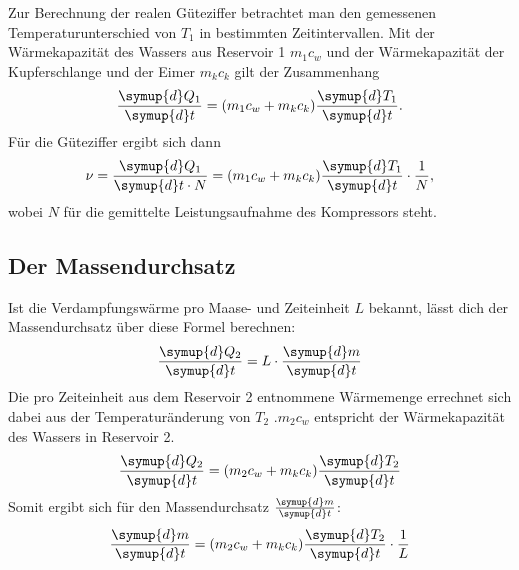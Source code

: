 Zur Berechnung der realen Güteziffer betrachtet man den gemessenen Temperaturunterschied von $T_1$ in bestimmten Zeitintervallen.
Mit der Wärmekapazität des Wassers aus Reservoir 1 $m_1c_w$ und der Wärmekapazität der Kupferschlange und der Eimer $m_kc_k$ gilt der Zusammenhang
\begin{equation}
    \frac{\symup{d}Q_1}{\symup{d}t} = (m_1c_w + m_kc_k) \frac{\symup{d}T_1}{\symup{d}t}.
\end{equation}
Für die Güteziffer ergibt sich dann 
\begin{equation}\label{eqn:gueteziffer}
    \nu = \frac{\symup{d}Q_1}{\symup{d}t \cdot N} = (m_1c_w + m_kc_k) \frac{\symup{d}T_1}{\symup{d}t} \cdot \frac{1}{N},
\end{equation}
wobei $N$ für die gemittelte Leistungsaufnahme des Kompressors steht.

\subsection{Der Massendurchsatz}
Ist die Verdampfungswärme pro Maase- und Zeiteinheit $L$ bekannt, lässt dich der Massendurchsatz über diese Formel berechnen:
\begin{equation}
    \frac{\symup{d}Q_2}{\symup{d}t} = L \cdot \frac{\symup{d}m}{\symup{d}t}
\end{equation}
Die pro Zeiteinheit aus dem Reservoir 2 entnommene Wärmemenge errechnet sich dabei aus der Temperaturänderung von $T_2$ .$m_2c_w$ entspricht der Wärmekapazität des Wassers in Reservoir 2.
\begin{equation}
    \frac{\symup{d}Q_2}{\symup{d}t} = (m_2c_w + m_kc_k) \frac{\symup{d}T_2}{\symup{d}t}
\end{equation}
Somit ergibt sich für den Massendurchsatz $\frac{\symup{d}m}{\symup{d}t}$:
\begin{equation}\label{eqn:massendurchsatz}
    \frac{\symup{d}m}{\symup{d}t} = (m_2c_w + m_kc_k) \frac{\symup{d}T_2}{\symup{d}t} \cdot \frac{1}{L}
\end{equation}

